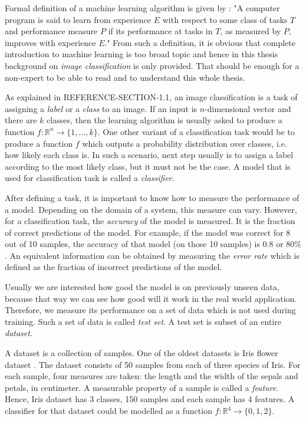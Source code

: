 Formal definition of a machine learning algorithm is given by \cite{Mitchell:1997:ML:541177}: "A computer program is said to learn from experience $E$ with respect to some class of tasks $T$ and performance measure $P$ if its performance at tasks in $T$, as measured by $P$, improves with experience $E$." 
From such a definition, it is obvious that complete introduction to machine learning is too broad topic and hence in this thesis background on \textit{image classification} is only provided. That should be enough for a non-expert to be able to read and to understand this whole thesis.

As explained in REFERENCE-SECTION-1.1, an image classification is a task of assigning a \textit{label} or a \textit{class} to an image. If an input is $n$-dimensional vector and there are $k$ classes, then the learning algorithm is usually asked to produce a function $f: \mathbb{R}^n \rightarrow \{1, ... , k\}$. One other variant of a classification task would be to produce a function $f$ which outputs a probability distribution over classes, i.e. how likely each class is. In such a scenario, next step usually is to assign a label according to the most likely class, but it must not be the case. A model that is used for classification task is called a \textit{classifier}.

After defining a task, it is important to know how to measure the performance of a model. Depending on the domain of a system, this measure can vary. However, for a classification task, the \textit{accuracy} of the model is measured. It is the fraction of correct predictions of the model. For example, if the model was correct for 8 out of 10 samples, the accuracy of that model (on those 10 samples) is $0.8$ or $80\%$. An equivalent information can be obtained by measuring the \textit{error rate} which is defined as the fraction of incorrect predictions of the model. 

Usually we are interested how good the model is on previously unseen data, because that way we can see how good will it work in the real world application. Therefore, we measure its performance on a set of data which is not used during training. Such a set of data is called \textit{test set}. A test set is subset of an entire \textit{dataset}.

A dataset is a collection of samples. One of the oldest datasets is Iris flower dataset \cite{iris-dataset}. The dataset consists of 50 samples from each of three species of Iris. For each sample, four measures are taken: the length and the width of the sepals and petals, in centimeter. A measurable property of a sample is called a \textit{feature}. Hence, Iris dataset has 3 classes, 150 samples and each sample has 4 features. A classifier for that dataset could be modelled as a function $f: \mathbb{R}^4 \rightarrow \{0, 1, 2\}$.
